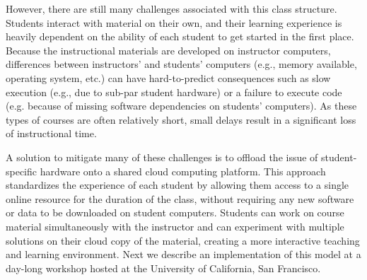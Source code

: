 However, there are still many challenges associated with this class structure.
Students interact with material on their own, and their learning experience is
heavily dependent on the ability of each student to get started in the first
place. Because the instructional materials are developed on instructor
computers, differences between instructors' and students' computers (e.g., memory
available, operating system, etc.) can have hard-to-predict consequences such
as slow execution (e.g., due to sub-par student hardware) or a failure to
execute code (e.g. because of missing software dependencies on
students' computers). As these types of courses are often relatively short,
small delays result in a significant loss of instructional time.

A solution to mitigate many of these challenges is to offload the issue of
student-specific hardware onto a shared cloud computing platform. This approach
standardizes the experience of each student by allowing them access to a single
online resource for the duration of the class, without requiring any new
software or data to be downloaded on student computers. Students can work
on course material simultaneously with the instructor and can
experiment with multiple solutions on their cloud copy of the material,
creating a more interactive teaching and learning environment. Next we describe
an implementation of this model at a day-long workshop hosted at the
University of California, San Francisco.
